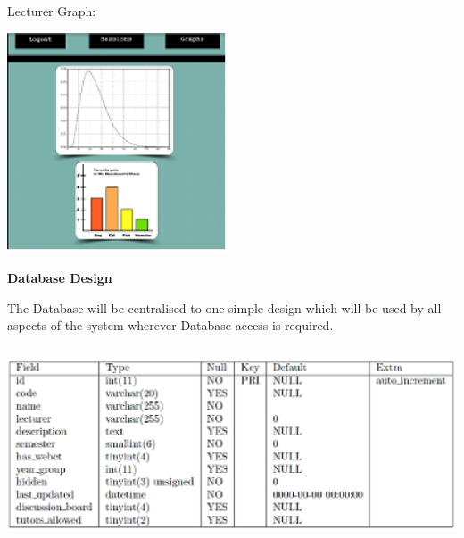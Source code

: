 \documentclass{article}
\begin{document}
Lecturer Graph:

\includegraphics*[width=2.58in, height=2.57in, keepaspectratio=false]{image15} 

\noindent \textbf{Database Design} 

\noindent The Database will be centralised to one simple design which will be used by all aspects of the system wherever Database access is required.

\textbf{\includegraphics*[width=5.91in, height=2.28in, keepaspectratio=false]{image16}}

 
\end{document}
